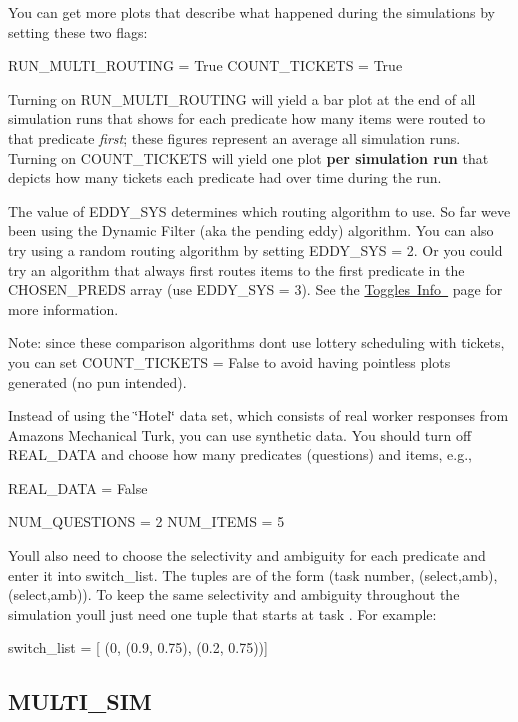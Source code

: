 \begin{DoxyItemize}
\item You can get more plots that describe what happened during the simulations by setting these two flags\+: \begin{DoxyVerb}RUN_MULTI_ROUTING = True
COUNT_TICKETS = True
\end{DoxyVerb}


Turning on {\ttfamily R\+U\+N\+\_\+\+M\+U\+L\+T\+I\+\_\+\+R\+O\+U\+T\+I\+NG} will yield a bar plot at the end of all simulation runs that shows for each predicate how many items were routed to that predicate {\itshape first}; these figures represent an average all simulation runs. Turning on {\ttfamily C\+O\+U\+N\+T\+\_\+\+T\+I\+C\+K\+E\+TS} will yield one plot {\bfseries{per simulation run}} that depicts how many tickets each predicate had over time during the run.
\item The value of {\ttfamily E\+D\+D\+Y\+\_\+\+S\+YS} determines which routing algorithm to use. So far we\textquotesingle{}ve been using the Dynamic Filter (aka the pending eddy) algorithm. You can also try using a random routing algorithm by setting {\ttfamily E\+D\+D\+Y\+\_\+\+S\+YS = 2}. Or you could try an algorithm that always first routes items to the first predicate in the C\+H\+O\+S\+E\+N\+\_\+\+P\+R\+E\+DS array (use {\ttfamily E\+D\+D\+Y\+\_\+\+S\+YS = 3}). See the \mbox{\hyperlink{toggles}{Toggles Info }} page for more information.

Note\+: since these comparison algorithms don\textquotesingle{}t use lottery scheduling with tickets, you can set {\ttfamily C\+O\+U\+N\+T\+\_\+\+T\+I\+C\+K\+E\+TS = False} to avoid having pointless plots generated (no pun intended).
\item Instead of using the \char`\"{}\+Hotel\char`\"{} data set, which consists of real worker responses from Amazon\textquotesingle{}s Mechanical Turk, you can use synthetic data. You should turn off {\ttfamily R\+E\+A\+L\+\_\+\+D\+A\+TA} and choose how many predicates (questions) and items, e.\+g., \begin{DoxyVerb}REAL_DATA = False

NUM_QUESTIONS = 2
NUM_ITEMS = 5
\end{DoxyVerb}


You\textquotesingle{}ll also need to choose the selectivity and ambiguity for each predicate and enter it into {\ttfamily switch\+\_\+list}. The tuples are of the form {\ttfamily (task number, (select,amb), (select,amb))}. To keep the same selectivity and ambiguity throughout the simulation you\textquotesingle{}ll just need one tuple that starts at task {}. For example\+: \begin{DoxyVerb}switch_list = [ (0, (0.9, 0.75), (0.2, 0.75))]
\end{DoxyVerb}

\end{DoxyItemize}\hypertarget{install_info_MULTI_SIM}{}\subsection{M\+U\+L\+T\+I\+\_\+\+S\+IM}\label{install_info_MULTI_SIM}
